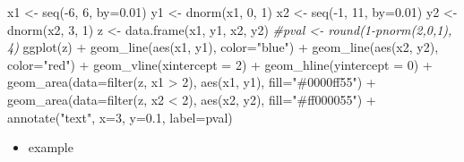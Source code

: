 \documentclass[
]{book}
\newenvironment{Shaded}{\begin{snugshade}}{\end{snugshade}}
\newcommand{\AttributeTok}[1]{\textcolor[rgb]{0.77,0.63,0.00}{#1}}
\newcommand{\CommentTok}[1]{\textcolor[rgb]{0.56,0.35,0.01}{\textit{#1}}}
\newcommand{\DecValTok}[1]{\textcolor[rgb]{0.00,0.00,0.81}{#1}}
\newcommand{\FloatTok}[1]{\textcolor[rgb]{0.00,0.00,0.81}{#1}}
\newcommand{\FunctionTok}[1]{\textcolor[rgb]{0.00,0.00,0.00}{#1}}
\newcommand{\NormalTok}[1]{#1}
\newcommand{\OtherTok}[1]{\textcolor[rgb]{0.56,0.35,0.01}{#1}}
\newcommand{\SpecialCharTok}[1]{\textcolor[rgb]{0.00,0.00,0.00}{#1}}
\newcommand{\StringTok}[1]{\textcolor[rgb]{0.31,0.60,0.02}{#1}}
\providecommand{\tightlist}{%
  \setlength{\itemsep}{0pt}\setlength{\parskip}{0pt}}
\begin{document}
\begin{Shaded}
\begin{Highlighting}[]

\NormalTok{x1 }\OtherTok{\textless{}{-}} \FunctionTok{seq}\NormalTok{(}\SpecialCharTok{{-}}\DecValTok{6}\NormalTok{, }\DecValTok{6}\NormalTok{, }\AttributeTok{by=}\FloatTok{0.01}\NormalTok{)}
\NormalTok{y1 }\OtherTok{\textless{}{-}} \FunctionTok{dnorm}\NormalTok{(x1, }\DecValTok{0}\NormalTok{, }\DecValTok{1}\NormalTok{)}
\NormalTok{x2 }\OtherTok{\textless{}{-}} \FunctionTok{seq}\NormalTok{(}\SpecialCharTok{{-}}\DecValTok{1}\NormalTok{, }\DecValTok{11}\NormalTok{, }\AttributeTok{by=}\FloatTok{0.01}\NormalTok{)}
\NormalTok{y2 }\OtherTok{\textless{}{-}} \FunctionTok{dnorm}\NormalTok{(x2, }\DecValTok{3}\NormalTok{, }\DecValTok{1}\NormalTok{)}
\NormalTok{z }\OtherTok{\textless{}{-}} \FunctionTok{data.frame}\NormalTok{(x1, y1, x2, y2)}
\CommentTok{\#pval \textless{}{-} round(1{-}pnorm(2,0,1), 4)}
\FunctionTok{ggplot}\NormalTok{(z) }\SpecialCharTok{+}
  \FunctionTok{geom\_line}\NormalTok{(}\FunctionTok{aes}\NormalTok{(x1, y1), }\AttributeTok{color=}\StringTok{"blue"}\NormalTok{) }\SpecialCharTok{+}
  \FunctionTok{geom\_line}\NormalTok{(}\FunctionTok{aes}\NormalTok{(x2, y2), }\AttributeTok{color=}\StringTok{"red"}\NormalTok{) }\SpecialCharTok{+}
  \FunctionTok{geom\_vline}\NormalTok{(}\AttributeTok{xintercept =} \DecValTok{2}\NormalTok{) }\SpecialCharTok{+}
  \FunctionTok{geom\_hline}\NormalTok{(}\AttributeTok{yintercept =} \DecValTok{0}\NormalTok{) }\SpecialCharTok{+}
  \FunctionTok{geom\_area}\NormalTok{(}\AttributeTok{data=}\FunctionTok{filter}\NormalTok{(z, x1 }\SpecialCharTok{\textgreater{}} \DecValTok{2}\NormalTok{), }
            \FunctionTok{aes}\NormalTok{(x1, y1), }
            \AttributeTok{fill=}\StringTok{"\#0000ff55"}\NormalTok{) }\SpecialCharTok{+}
  \FunctionTok{geom\_area}\NormalTok{(}\AttributeTok{data=}\FunctionTok{filter}\NormalTok{(z, x2 }\SpecialCharTok{\textless{}} \DecValTok{2}\NormalTok{), }
            \FunctionTok{aes}\NormalTok{(x2, y2), }
            \AttributeTok{fill=}\StringTok{"\#ff000055"}\NormalTok{) }\SpecialCharTok{+}
  \FunctionTok{annotate}\NormalTok{(}\StringTok{"text"}\NormalTok{, }\AttributeTok{x=}\DecValTok{3}\NormalTok{, }\AttributeTok{y=}\FloatTok{0.1}\NormalTok{, }\AttributeTok{label=}\NormalTok{pval) }
\end{Highlighting}
\end{Shaded}

\begin{itemize}
\tightlist
\item
  example
\end{itemize}
\end{document}
